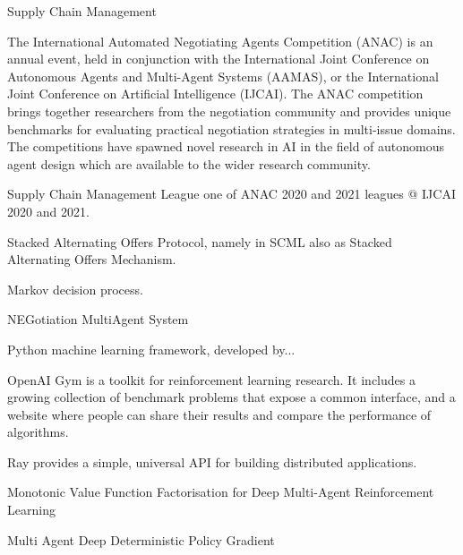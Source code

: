 

%
{%
Supply Chain Management}

%
{%
The International Automated Negotiating Agents Competition (ANAC) is an annual event, held in conjunction with the International Joint Conference on Autonomous Agents and Multi-Agent Systems (AAMAS), or the International Joint Conference on Artificial Intelligence (IJCAI). The ANAC competition brings together researchers from the negotiation community and provides unique benchmarks for evaluating practical negotiation strategies in multi-issue domains. The competitions have spawned novel research in AI in the field of autonomous agent design which are available to the wider research community.
}

%
{%
Supply Chain Management League one of ANAC 2020 and 2021 leagues @ IJCAI 2020 and 2021.}

%
{%
Stacked Alternating Offers Protocol, namely in SCML also as Stacked Alternating Offers Mechanism.
}

%
{%
Markov decision process.
}

%
{%
NEGotiation MultiAgent System
}

%
{%
Python machine learning framework, developed by...
}

%
{%
OpenAI Gym is a toolkit for reinforcement learning research. It includes a growing collection of benchmark problems that expose a common interface, and a website where people can share their results and compare the performance of algorithms.
}

%
{%
Ray provides a simple, universal API for building distributed applications.
}

%
{%
Monotonic Value Function Factorisation for Deep Multi-Agent Reinforcement Learning
}

%
{%
Multi Agent Deep Deterministic Policy Gradient
}

